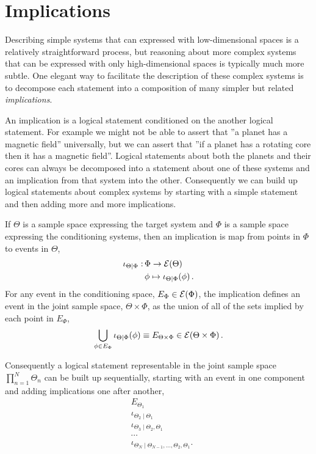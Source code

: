 \section{Implications}

Describing simple systems that can expressed with low-dimensional
spaces is a relatively straightforward process, but reasoning about more
complex systems that can be expressed with only high-dimensional
spaces is typically much more subtle.  One elegant way to facilitate the 
description of these complex systems is to decompose each statement
into a composition of many simpler but related \emph{implications}.

An implication is a logical statement conditioned on the another logical
statement.  For example we might not be able to assert that ''a planet
has a magnetic field'' universally, but we can assert that ''if a planet has
a rotating core then it has a magnetic field''.  Logical statements about
both the planets and their cores can always be decomposed into a
statement about one of these systems and an implication from that
system into the other.  Consequently we can build up logical statements
about complex systems by starting with a simple statement and then
adding more and more implications.

If $\Theta$ is a sample space expressing the target system and 
$\Phi$ is a sample space expressing the conditioning systems, then
an implication is map from points in $\Phi$ to events in $\Theta$,
%
\begin{align*}
\iota_{\Theta \mid \Phi} :& \, \Phi \rightarrow  \mathcal{E} \! \left( \Theta \right) 
\\
& \, \phi \mapsto \iota_{\Theta \mid \Phi} \! \left( \phi \right).
\end{align*}
%
For any event in the conditioning space, $E_{\Phi} \in  \mathcal{E} \! \left( \Phi \right) $,
the implication defines an event in the joint sample space, $\Theta \times \Phi$, 
as the union of all of the sets implied by each point in $E_{\Phi}$,
%
\begin{equation*}
\bigcup_{\phi \in E_{\Phi} } \iota_{\Theta \mid \Phi} \! \left( \phi \right)
\equiv
E_{\Theta \times \Phi}
\in
 \mathcal{E} \! \left( \Theta \times \Phi \right) .
\end{equation*}

Consequently a logical statement representable in the joint sample
space $\prod_{n = 1}^{N} \Theta_{n}$ can be built up sequentially, starting with 
an event in one component and adding implications one after another,
%
\begin{align*}
& E_{\Theta_{1}} \\
& \iota_{\Theta_{2} \mid \Theta_{1}} \\
& \iota_{\Theta_{3} \mid \Theta_{2}, \Theta_{1}} \\
& \cdots \\
& \iota_{\Theta_{N} \mid \Theta_{N - 1}, \ldots, \Theta_{2}, \Theta_{1}}.
\end{align*}